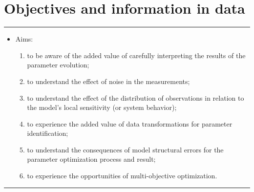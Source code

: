 \chapter{Objectives and information in data}
\thispagestyle{fancy}
\label{ch:objectives-and-information-in-data}



\hrule
\begin{itemize}
\footnotesize
\item[]{Aims:}
\begin{enumerate}
\item{to be aware of the added value of carefully interpreting the results of the parameter evolution;}
\item{to understand the effect of noise in the measurements;}
\item{to understand the effect of the distribution of observations in relation to the model's local sensitivity (or system behavior);}
\item{to experience the added value of data transformations for parameter identification;}
\item{to understand the consequences of model structural errors for the parameter optimization process and result;}
\item{to experience the opportunities of multi-objective optimization.}
\end{enumerate}
\end{itemize}
\hrule
\vspace{1em}




